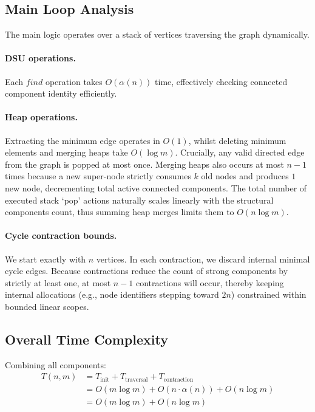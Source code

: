 \documentclass[UTF8, a4paper]{article}
\theoremstyle{definition}
\begin{document}
\subsection{Main Loop Analysis}

The main logic operates over a stack of vertices traversing the graph dynamically.

\paragraph{DSU operations.} Each $find$ operation takes $O(\alpha(n))$ time, effectively checking connected component identity efficiently.

\paragraph{Heap operations.} Extracting the minimum edge operates in $O(1)$, whilst deleting minimum elements and merging heaps take $O(\log m)$. Crucially, any valid directed edge from the graph is popped at most once. Merging heaps also occurs at most $n-1$ times because a new super-node strictly consumes $k$ old nodes and produces $1$ new node, decrementing total active connected components.
The total number of executed stack `pop' actions naturally scales linearly with the structural components count, thus summing heap merges limits them to $O(n \log m)$.

\paragraph{Cycle contraction bounds.} We start exactly with $n$ vertices. In each contraction, we discard internal minimal cycle edges. Because contractions reduce the count of strong components by strictly at least one, at most $n-1$ contractions will occur, thereby keeping internal allocations (e.g., node identifiers stepping toward $2n$) constrained within bounded linear scopes.

\subsection{Overall Time Complexity}

Combining all components:
\begin{align*}
T(n, m) &= T_{\text{init}} + T_{\text{traversal}} + T_{\text{contraction}} \\
&= O(m \log m) + O(n \cdot \alpha(n)) + O(n \log m) \\
&= O(m \log m) + O(n \log m)
\end{align*}
\end{document}
